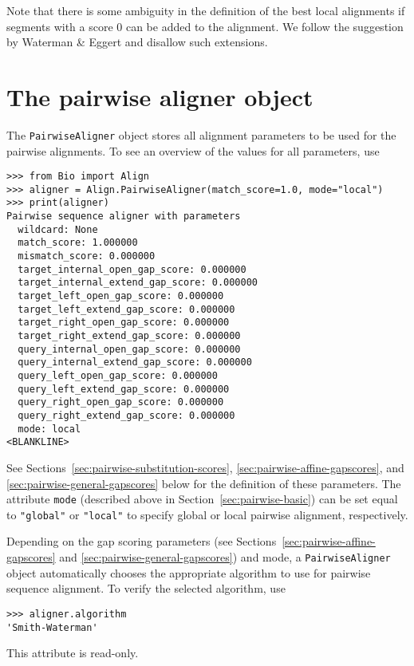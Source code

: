 Note that there is some ambiguity in the definition of the best local alignments if segments with a score 0 can be added to the alignment. We follow the suggestion by Waterman \& Eggert \cite{waterman1987} and disallow such extensions.

\section{The pairwise aligner object}
\label{sec:pairwise-aligner}

The \verb+PairwiseAligner+ object stores all alignment parameters to be used
for the pairwise alignments. To see an overview of the values for all parameters, use

\begin{verbatim}
>>> from Bio import Align
>>> aligner = Align.PairwiseAligner(match_score=1.0, mode="local")
>>> print(aligner)
Pairwise sequence aligner with parameters
  wildcard: None
  match_score: 1.000000
  mismatch_score: 0.000000
  target_internal_open_gap_score: 0.000000
  target_internal_extend_gap_score: 0.000000
  target_left_open_gap_score: 0.000000
  target_left_extend_gap_score: 0.000000
  target_right_open_gap_score: 0.000000
  target_right_extend_gap_score: 0.000000
  query_internal_open_gap_score: 0.000000
  query_internal_extend_gap_score: 0.000000
  query_left_open_gap_score: 0.000000
  query_left_extend_gap_score: 0.000000
  query_right_open_gap_score: 0.000000
  query_right_extend_gap_score: 0.000000
  mode: local
<BLANKLINE>
\end{verbatim}
See Sections~\ref{sec:pairwise-substitution-scores}, \ref{sec:pairwise-affine-gapscores}, and \ref{sec:pairwise-general-gapscores} below for the definition of these
parameters. The attribute \verb+mode+ (described above in Section~\ref{sec:pairwise-basic}) can be set equal to \verb+"global"+ or \verb+"local"+ to specify global or local pairwise alignment, respectively.

Depending on the gap scoring parameters
(see Sections~\ref{sec:pairwise-affine-gapscores} and
\ref{sec:pairwise-general-gapscores}) and mode, a \verb+PairwiseAligner+ object
automatically chooses the appropriate algorithm to use for pairwise sequence alignment. To verify the selected algorithm, use

\begin{verbatim}
>>> aligner.algorithm
'Smith-Waterman'
\end{verbatim}
This attribute is read-only.

